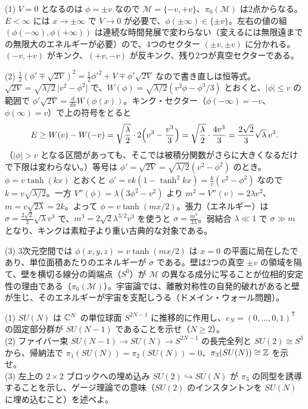 \begin{solution}
(1) $V=0$ となるのは $\phi=\pm v$ なので $\mathcal M=\{-v,+v\}$、$\pi_0(\mathcal M)$ は2点からなる。$E<\infty$ には $x\to\pm\infty$ で $V\to0$ が必要で、$\phi(\pm\infty)\in\{\pm v\}$。左右の値の組 $(\phi(-\infty),\phi(+\infty))$ は連続な時間発展で変わらない（変えるには無限遠までの無限大のエネルギーが必要）ので、4つのセクター $(\pm v,\pm v)$ に分かれる。$(-v,+v)$ がキンク、$(+v,-v)$ が反キンク、残り2つが真空セクターである。

(2) $\frac12(\phi'\mp\sqrt{2V})^2=\frac12\phi'^2+V\mp\phi'\sqrt{2V}$ なので書き直しは恒等式。$\sqrt{2V}=\sqrt{\lambda/2}\,\lvert v^2-\phi^2\rvert$ で、$W(\phi)=\sqrt{\lambda/2}(v^2\phi-\phi^3/3)$ とおくと、$\lvert\phi\rvert\le v$ の範囲で $\phi'\sqrt{2V}=\frac{d}{dx}W(\phi(x))$。キンク・セクター（$\phi(-\infty)=-v$、$\phi(\infty)=v$）で上の符号をとると
\[
E\ge W(v)-W(-v)=\sqrt{\frac\lambda2}\cdot2\Bigl(v^3-\frac{v^3}3\Bigr)=\sqrt{\frac\lambda2}\cdot\frac{4v^3}{3}=\frac{2\sqrt2}{3}\sqrt\lambda\,v^3 .
\]
（$\lvert\phi\rvert>v$ となる区間があっても、そこでは被積分関数がさらに大きくなるだけで下限は変わらない。）等号は $\phi'=\sqrt{2V}=\sqrt{\lambda/2}(v^2-\phi^2)$ のとき。$\phi=v\tanh(kx)$ とおくと $\phi'=vk(1-\tanh^2kx)=\frac kv(v^2-\phi^2)$ なので $k=v\sqrt{\lambda/2}$。一方 $V''(\phi)=\lambda(3\phi^2-v^2)$ より $m^2=V''(v)=2\lambda v^2$、$m=v\sqrt{2\lambda}=2k$。よって $\phi=v\tanh(mx/2)$。張力（エネルギー）は $\sigma=\frac{2\sqrt2}{3}\sqrt\lambda v^3$ で、$m^3=2\sqrt2\lambda^{3/2}v^3$ を使うと $\sigma=\frac{m^3}{3\lambda}$。弱結合 $\lambda\ll1$ で $\sigma\gg m$ となり、キンクは素粒子より重い古典的な対象である。

(3) 3次元空間では $\phi(x,y,z)=v\tanh(mx/2)$ は $x=0$ の平面に局在したであり、単位面積あたりのエネルギーが $\sigma$ である。壁は2つの真空 $\pm v$ の領域を隔て、壁を横切る線分の両端点（$S^0$）が $\mathcal M$ の異なる成分に写ることが位相的安定性の理由である（$\pi_0(\mathcal M)$）。宇宙論では、離散対称性の自発的破れがあると壁が生じ、そのエネルギーが宇宙を支配しうる（ドメイン・ウォール問題）。
\end{solution}

\begin{problem}[難易度 B]\label{ch03-prob-sun}
(1) $SU(N)$ は $\mathbb{C}^N$ の単位球面 $S^{2N-1}$ に推移的に作用し、$e_N=(0,\dots,0,1)^{\mathsf T}$ の固定部分群が $SU(N-1)$ であることを示せ（$N\ge2$）。\\
(2) ファイバー束 $SU(N-1)\to SU(N)\to S^{2N-1}$ の長完全列と $SU(2)\cong S^3$ から、帰納法で $\pi_1(SU(N))=\pi_2(SU(N))=0$、$\pi_3(SU(N))\cong\mathbb{Z}$ を示せ。\\
(3) 左上の $2\times2$ ブロックへの埋め込み $SU(2)\hookrightarrow SU(N)$ が $\pi_3$ の同型を誘導することを示し、ゲージ理論での意味（$SU(2)$ のインスタントンを $SU(N)$ に埋め込むこと）を述べよ。
\end{problem}

